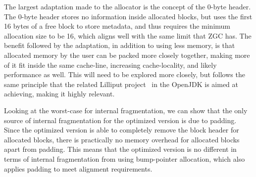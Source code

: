 
The largest adaptation made to the allocator is the concept of the 0-byte header. The 0-byte header stores no information inside allocated blocks, but uses the first 16 bytes of a free block to store metadata, and thus requires the minimum allocation size to be 16, which aligns well with the same limit that ZGC has. The benefit followed by the adaptation, in addition to using less memory, is that allocated memory by the user can be packed more closely together, making more of it fit inside the same cache-line, increasing cache-locality, and likely performance as well. This will need to be explored more closely, but follows the same principle that the related Lilliput project~\cite{lilliput} in the OpenJDK is aimed at achieving, making it highly relevant.

Looking at the worst-case for internal fragmentation, we can show that the only source of internal fragmentation for the optimized version is due to padding. Since the optimized version is able to completely remove the block header for allocated blocks, there is practically no memory overhead for allocated blocks apart from padding. This means that the optimized version is no different in terms of internal fragmentation from using bump-pointer allocation, which also applies padding to meet alignment requirements.


